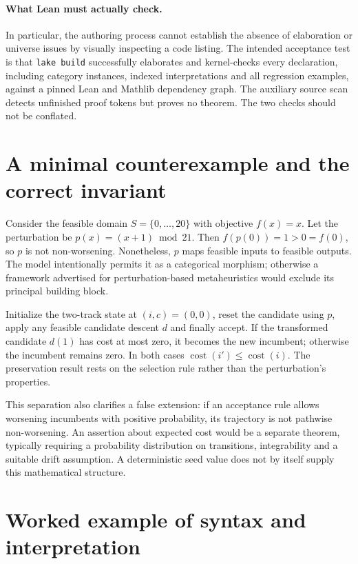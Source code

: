 \documentclass[11pt,a4paper]{article}
\begin{document}
\paragraph{What Lean must actually check.}
In particular, the authoring process cannot establish the absence of
elaboration or universe issues by visually inspecting a code listing.
The intended acceptance test is that \texttt{lake build} successfully
elaborates and kernel-checks every declaration, including category instances,
indexed interpretations and all regression examples, against a pinned Lean
and Mathlib dependency graph. The auxiliary source scan detects unfinished
proof tokens but proves no theorem. The two checks should not be conflated.

\section{A minimal counterexample and the correct invariant}
Consider the feasible domain $S=\{0,\ldots,20\}$ with objective $f(x)=x$.
Let the perturbation be $p(x)=(x+1)\bmod 21$. Then
$f(p(0))=1>0=f(0)$, so $p$ is not non-worsening. Nonetheless, $p$ maps
feasible inputs to feasible outputs. The model intentionally permits it
as a categorical morphism; otherwise a framework advertised for
perturbation-based metaheuristics would exclude its principal building
block.

Initialize the two-track state at $(i,c)=(0,0)$, reset the candidate using
$p$, apply any feasible candidate descent $d$ and finally accept. If
the transformed candidate $d(1)$ has cost at most zero, it becomes the
new incumbent; otherwise the incumbent remains zero. In both cases
$\operatorname{cost}(i')\le\operatorname{cost}(i)$. The preservation result
rests on the selection rule rather than the perturbation's properties.

This separation also clarifies a false extension: if an acceptance rule
allows worsening incumbents with positive probability, its trajectory is
not pathwise non-worsening. An assertion about expected cost would be a
separate theorem, typically requiring a probability distribution on
transitions, integrability and a suitable drift assumption. A deterministic
seed value does not by itself supply this mathematical structure.

\section{Worked example of syntax and interpretation}
\end{document}
